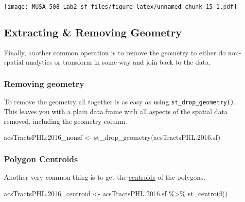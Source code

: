 \documentclass[
]{article}
\newenvironment{Shaded}{\begin{snugshade}}{\end{snugshade}}
\newcommand{\FloatTok}[1]{\textcolor[rgb]{0.00,0.00,0.81}{#1}}
\newcommand{\FunctionTok}[1]{\textcolor[rgb]{0.00,0.00,0.00}{#1}}
\newcommand{\NormalTok}[1]{#1}
\newcommand{\OtherTok}[1]{\textcolor[rgb]{0.56,0.35,0.01}{#1}}
\newcommand{\SpecialCharTok}[1]{\textcolor[rgb]{0.00,0.00,0.00}{#1}}
\begin{document}
\texttt{[image: MUSA\_508\_Lab2\_sf\_files/figure-latex/unnamed-chunk-15-1.pdf]}

\hypertarget{extracting-removing-geometry}{%
\subsection{Extracting \& Removing
Geometry}\label{extracting-removing-geometry}}

Finally, another common operation is to remove the geometry to either do
non-spatial analytics or transform in some way and join back to the
data.

\hypertarget{removing-geometry}{%
\subsubsection{Removing geometry}\label{removing-geometry}}

To remove the geometry all together is as easy as using
\texttt{st\_drop\_geometry()}. This leaves you with a plain data.frame
with all aspects of the spatial data removed, including the geometry
column.

\begin{Shaded}
\begin{Highlighting}[]
\NormalTok{acsTractsPHL}\FloatTok{.2016}\NormalTok{\_nonsf }\OtherTok{\textless{}{-}} \FunctionTok{st\_drop\_geometry}\NormalTok{(acsTractsPHL.}\FloatTok{2016.}\NormalTok{sf)}
\end{Highlighting}
\end{Shaded}

\hypertarget{polygon-centroids}{%
\subsubsection{Polygon Centroids}\label{polygon-centroids}}

Another very common thing is to get the
\href{https://geocompr.robinlovelace.net/geometric-operations.html\#centroids}{centroids}
of the polygons.

\begin{Shaded}
\begin{Highlighting}[]
\NormalTok{acsTractsPHL}\FloatTok{.2016}\NormalTok{\_centroid }\OtherTok{\textless{}{-}}\NormalTok{ acsTractsPHL.}\FloatTok{2016.}\NormalTok{sf }\SpecialCharTok{\%\textgreater{}\%} 
  \FunctionTok{st\_centroid}\NormalTok{()}
\end{Highlighting}
\end{Shaded}
\end{document}
